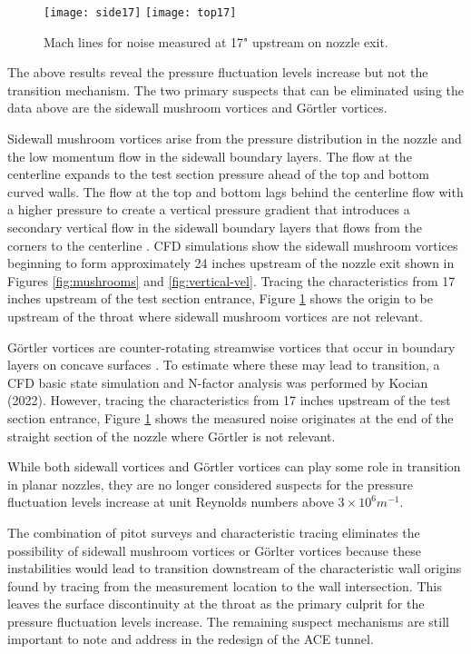\begin{figure}[ht]
    \centering
    \texttt{[image: side17]}
    \texttt{[image: top17]}
    \caption{Mach lines for noise measured at 17" upstream on nozzle exit.}
    \label{fig:machlines}
\end{figure}

The above results reveal the pressure fluctuation levels increase but not the transition mechanism. The two primary suspects that can be eliminated using the data above are the sidewall mushroom vortices and Görtler vortices.

Sidewall mushroom vortices arise from the pressure distribution in the nozzle and the low momentum flow in the sidewall boundary layers. The flow at the centerline expands to the test section pressure ahead of the top and bottom curved walls. The flow at the top and bottom lags behind the centerline flow with a higher pressure to create a vertical pressure gradient that introduces a secondary vertical flow in the sidewall boundary layers that flows from the corners to the centerline \cite{sabnis}. CFD simulations show the sidewall mushroom vortices beginning to form approximately 24 inches upstream of the nozzle exit shown in Figures \ref{fig:mushrooms} and \ref{fig:vertical-vel}. Tracing the characteristics from 17 inches upstream of the test section entrance, Figure \ref{fig:machlines} shows the origin to be upstream of the throat where sidewall mushroom vortices are not relevant.

Görtler vortices are counter-rotating streamwise vortices that occur in boundary layers on concave surfaces \cite{saric}. To estimate where these may lead to transition, a CFD basic state simulation and N-factor analysis was performed by Kocian (2022). However, tracing the characteristics from 17 inches upstream of the test section entrance, Figure \ref{fig:machlines} shows the measured noise originates at the end of the straight section of the nozzle where Görtler is not relevant.

While both sidewall vortices and Görtler vortices can play some role in transition in planar nozzles, they are no longer considered suspects for the pressure fluctuation levels increase at unit Reynolds numbers above $3 \times 10^6 m^{-1}$.

The combination of pitot surveys and characteristic tracing eliminates the possibility of sidewall mushroom vortices or Görlter vortices because these instabilities would lead to transition downstream of the characteristic wall origins found by tracing from the measurement location to the wall intersection. This leaves the surface discontinuity at the throat as the primary culprit for the pressure fluctuation levels increase. The remaining suspect mechanisms are still important to note and address in the redesign of the ACE tunnel.

